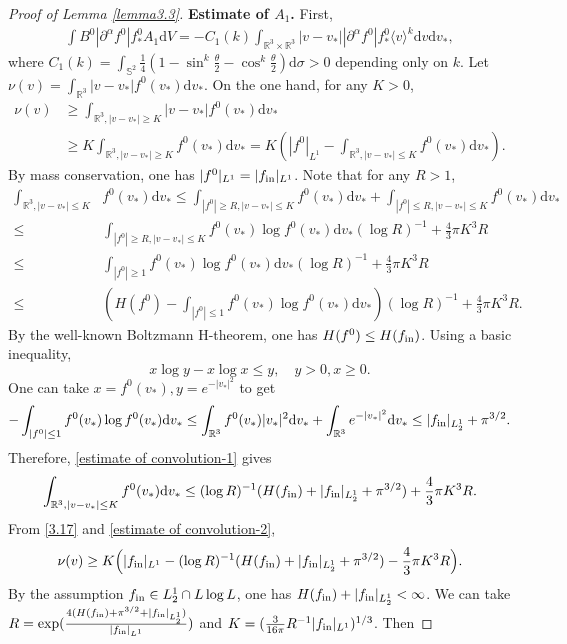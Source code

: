 \documentclass[reqno,10pt]{amsart}
\let\pa=\partial
\let\al=\alpha
\def\pa{\partial}
\def\th{\theta}
\newcommand{\beq}{\begin{equation}}
\newcommand{\eeq}{\end{equation}}
\newcommand{\ben}{\begin{eqnarray}}
\newcommand{\een}{\end{eqnarray}}
\newcommand{\beno}{\begin{eqnarray*}}
\newcommand{\eeno}{\end{eqnarray*}}
\theoremstyle{definition}
\numberwithin{equation}{section}
\begin{document}
\begin{proof}[Proof of Lemma \ref{lemma3.3}]
  \textbf{Estimate of $A_1$.} First,
    \ben\label{3.16}
    \int B^0|\pa^{\al}f^0|f^0_* A_1 \mathrm{d}V=-C_1(k)\int_{\mathbb{R}^3\times\mathbb{R}^3}|v-v_*||\pa^{\al}f^0|f^0_*\langle v\rangle^{k}\mathrm{d}v\mathrm{d}v_*,
    \een
    where $C_1(k)=\int_{\mathbb{S}^2}\frac{1}{4}(1-\sin^{k}\frac{\th}{2}-\cos^{k}\frac{\th}{2})\mathrm{d}\sigma>0$ depending only on $k$.
 Let
   $\nu(v)=
\int_{\mathbb{R}^3}|v-v_*|f^0(v_*)\mathrm{d}v_*$. On the one hand, for any $K>0$,
\beq\label{3.17}
\begin{aligned}
    \nu(v)&\ge \int_{\mathbb{R}^3,|v-v_*|\ge K}|v-v_*|f^0(v_*)\mathrm{d}v_*\\
    &\ge K\int_{\mathbb{R}^3,|v-v_*|\ge K}f^0(v_*)\mathrm{d}v_*=K(|f^0|_{L^1}-\int_{\mathbb{R}^3,|v-v_*|\le K}f^0(v_*)\mathrm{d}v_*).
\end{aligned}
\eeq
By mass conservation, one has $|f^0|_{L^1}=|f_{\textup{in}}|_{L^1}$. Note that for any $R>1$,
\beq\label{estimate of convolution-1}
\begin{aligned}
\int_{\mathbb{R}^3,|v-v_*|\le K}&f^0(v_*)\mathrm{d}v_*\le \int_{|f^0|\ge R,|v-v_*|\le K}f^0(v_*)\mathrm{d}v_*+\int_{|f^0|\le R,|v-v_*|\le K}f^0(v_*)\mathrm{d}v_*\\
\le & \int_{|f^0|\ge R,|v-v_*|\le K}f^0(v_*)\log f^0(v_*)\mathrm{d}v_* (\log R)^{-1}+ \frac{4}{3}\pi K^3R\\
\le & \int_{|f^0|\ge 1}f^0(v_*)\log f^0(v_*)\mathrm{d}v_* (\log R)^{-1}+ \frac{4}{3}\pi K^3R\\
\le & (H(f^0)-\int_{|f^0|\le 1}f^0(v_*)\log f^0(v_*)\mathrm{d}v_*)(\log R)^{-1}+\frac{4}{3}\pi K^3R.
\end{aligned}
\eeq
By the well-known Boltzmann H-theorem, one has $H(f^0)\le H(f_{\textup{in}})$. Using a basic inequality,
$$x\log y-x\log x\le y,\quad y>0,x\ge 0.$$
One can take $x=f^0(v_*),y=e^{-|v_*|^2}$ to get
$$-\int_{|f^0|\le 1}f^0(v_*)\log f^0(v_*)\mathrm{d}v_*\le \int_{\mathbb{R}^3} f^0(v_*)|v_*|^2\mathrm{d}v_*+\int_{\mathbb{R}^3} e^{-|v_*|^2}\mathrm{d}v_*\le |f_{\textup{in}}|_{L^1_2}+\pi^{3/2}.$$
Therefore, \eqref{estimate of convolution-1} gives
\ben\label{estimate of convolution-2}
\int_{\mathbb{R}^3,|v-v_*|\le K}f^0(v_*)\mathrm{d}v_*\le (\log R)^{-1}(H(f_{\textup{in}})+|f_{\textup{in}}|_{L^1_2}+\pi^{3/2})+\frac{4}{3}\pi K^3R.
\een
From \eqref{3.17} and \eqref{estimate of convolution-2},
\beno
\nu(v)\ge K\Big(|f_{\textup{in}}|_{L^1}-(\log R)^{-1}(H(f_{\textup{in}})+|f_{\textup{in}}|_{L^1_2}+\pi^{3/2})-\frac{4}{3}\pi K^3R\Big).
\eeno
 By the assumption $f_{\textup{in}}\in L^1_{2}\cap L\log L$, one has $H(f_{\textup{in}})+|f_{\textup{in}}|_{L^1_{2}}<\infty$. We can take $R=\exp(\frac{4(H(f_{\textup{in}})+\pi^{3/2}+|f_{\textup{in}}|_{L^1_{2}})}{|f_{\textup{in}}|_{L^1}})$ and $K=(\frac{3}{16\pi}R^{-1}|f_{\textup{in}}|_{L^1})^{1/3}$. Then

\end{proof}
\end{document}
